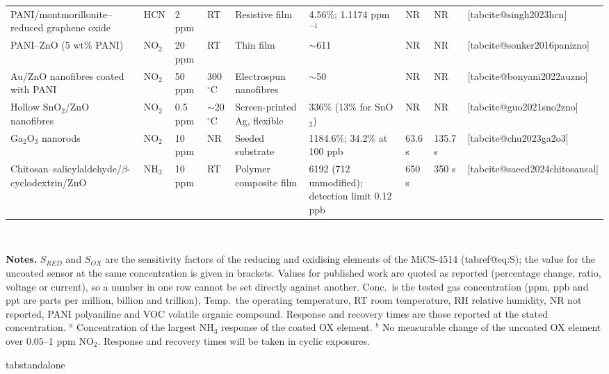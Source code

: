 \documentclass[11pt]{article}
\makeatletter
\newcommand{\Cref}[1]{\csname tabref@#1\endcsname}
\renewcommand{\cite}[1]{[\csname tabcite@#1\endcsname]}
\makeatother
\begin{document}
\begin{table}[!htbp]
\begin{adjustbox}{max width=\textwidth,center}
\begin{tabular}{L{3.3cm}L{1.4cm}L{1.3cm}L{1.1cm}L{2.3cm}L{2.6cm}L{1.4cm}L{1.4cm}L{1.1cm}}
PANI/montmorillonite--reduced graphene oxide & HCN & 2 ppm & RT & Resistive film & 4.56\%; 1.1174 ppm$^{-1}$ & NR & NR & \cite{singh2023hcn} \\
PANI--ZnO (5 wt\% PANI) & NO$_2$ & 20 ppm & RT & Thin film & $\sim$611 & NR & NR & \cite{sonker2016panizno} \\
Au/ZnO nanofibres coated with PANI & NO$_2$ & 50 ppm & 300 $^{\circ}$C & Electrospun nanofibres & $\sim$50 & NR & NR & \cite{bonyani2022auzno} \\
Hollow SnO$_2$/ZnO nanofibres & NO$_2$ & 0.5 ppm & $\sim$20 $^{\circ}$C & Screen-printed Ag, flexible & 336\% (13\% for SnO$_2$) & NR & NR & \cite{guo2021sno2zno} \\
Ga$_2$O$_3$ nanorods & NO$_2$ & 10 ppm & NR & Seeded substrate & 1184.6\%; 34.2\% at 100 ppb & 63.6 s & 135.7 s & \cite{chu2023ga2o3} \\
Chitosan--salicylaldehyde/$\beta$-cyclodextrin/ZnO & NH$_3$ & 10 ppm & RT & Polymer composite film & 6192 (712 unmodified); detection limit 0.12 ppb & 650 s & 350 s & \cite{saeed2024chitosansal} \\
\bottomrule
\end{tabular}
\end{adjustbox}
\\[3pt]
\begin{minipage}{0.96\textwidth}
\raggedright\scriptsize \textbf{Notes.} $S_{RED}$ and $S_{OX}$ are the sensitivity factors of the reducing and oxidising elements of the MiCS-4514 (\Cref{eq:S}); the value for the uncoated sensor at the same concentration is given in brackets. Values for published work are quoted as reported (percentage change, ratio, voltage or current), so a number in one row cannot be set directly against another. Conc.\ is the tested gas concentration (ppm, ppb and ppt are parts per million, billion and trillion), Temp.\ the operating temperature, RT room temperature, RH relative humidity, NR not reported, PANI polyaniline and VOC volatile organic compound. Response and recovery times are those reported at the stated concentration. $^{a}$ Concentration of the largest NH$_3$ response of the coated OX element. $^{b}$ No measurable change of the uncoated OX element over 0.05--1 ppm NO$_2$. Response and recovery times will be taken in cyclic exposures.
\end{minipage}
\end{table}
\expandafter\ifx\csname tabstandalone\endcsname\relax\else
\end{document}
